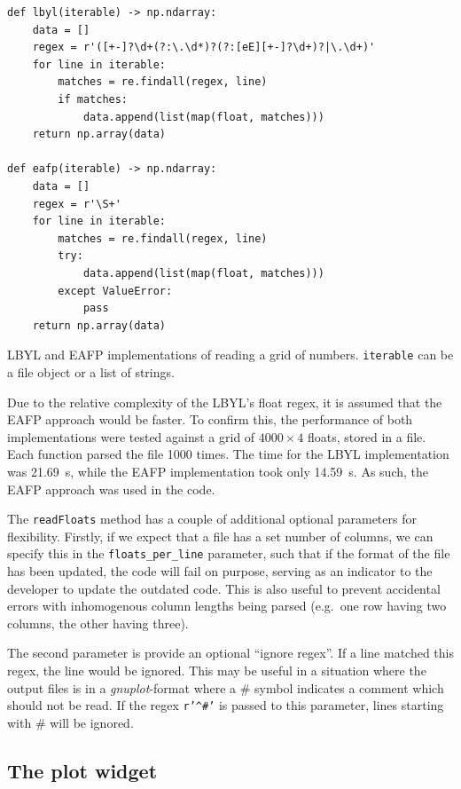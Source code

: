 \documentclass[12pt]{article}
\newenvironment{code}{\captionsetup{type=listing}}{\par\addvspace{\baselineskip}}
\begin{document}
\begin{code}\begin{verbatim}
def lbyl(iterable) -> np.ndarray:
    data = []
    regex = r'([+-]?\d+(?:\.\d*)?(?:[eE][+-]?\d+)?|\.\d+)'
    for line in iterable:
        matches = re.findall(regex, line)
        if matches:
            data.append(list(map(float, matches)))
    return np.array(data)

def eafp(iterable) -> np.ndarray:
    data = []
    regex = r'\S+'
    for line in iterable:
        matches = re.findall(regex, line)
        try:
            data.append(list(map(float, matches)))
        except ValueError:
            pass
    return np.array(data)
\end{verbatim}
\caption{LBYL and EAFP implementations of reading a grid of numbers. \texttt{iterable} can be a file object or a list of strings.}
\label{lst:read_floats}
\end{code}

Due to the relative complexity of the LBYL's float regex, it is assumed that the EAFP approach would be faster. To confirm this, the performance of both implementations were tested against a grid of \(4000\times 4\) floats, stored in a file. Each function parsed the file 1000 times. The time for the LBYL implementation was 21.69~s, while the EAFP implementation took only 14.59~s. As such, the EAFP approach was used in the code.

The \texttt{readFloats} method has a couple of additional optional parameters for flexibility. Firstly, if we expect that a file has a set number of columns, we can specify this in the \texttt{floats\_per\_line} parameter, such that if the format of the file has been updated, the code will fail on purpose, serving as an indicator to the developer to update the outdated code. This is also useful to prevent accidental errors with inhomogenous column lengths being parsed (e.g.~one row having two columns, the other having three). 

The second parameter is provide an optional ``ignore regex''. If a line matched this regex, the line would be ignored. This may be useful in a situation where the output files is in a \textit{gnuplot}-format where a \# symbol indicates a comment which should not be read. If the regex \texttt{r'^#'} is passed to this parameter, lines starting with \# will be ignored.

\subsection{The plot widget}\label{ssec:plot_widget}
\end{document}
